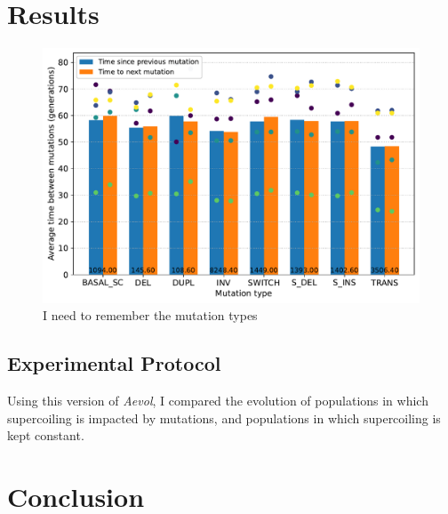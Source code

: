 \section{Results}
\label{sec:aevol_results}

\begin{figure}[H]
\includegraphics[width=\textwidth]{aevol/images/with_sc_mut_time_150k_995k.pdf}
\caption{I need to remember the mutation types}
\end{figure}

\subsection{Experimental Protocol}

Using this version of \emph{Aevol}, I compared the evolution of populations in which supercoiling is impacted by mutations, and populations in which supercoiling is kept constant.


\section{Conclusion}
\label{sec:aevol_ccl}
